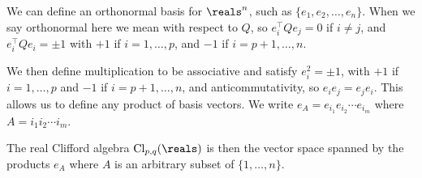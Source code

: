 \documentclass[fleqn]{NotesClass}
\newcommand*{\trans}{\top}
\begin{document}
    We can define an orthonormal basis for \(\reals^n\), such as \(\{e_1, e_2, \dotsc, e_n\}\).
    When we say orthonormal here we mean with respect to \(Q\), so \(e_i^\trans Qe_j = 0\) if \(i \ne j\), and \(e_i^\trans Qe_i = \pm 1\) with \(+1\) if \(i = 1, \dotsc, p\), and \(-1\) if \(i = p+1, \dotsc, n\).
    
    We then define multiplication to be associative and satisfy \(e_i^2 = \pm 1\), with \(+1\) if \(i = 1, \dotsc, p\) and \(-1\) if \(i = p + 1, \dotsc, n\), and anticommutativity, so \(e_ie_j = e_je_i\).
    This allows us to define any product of basis vectors.
    We write \(e_{A} = e_{i_1}e_{i_2} \dotsm e_{i_m}\) where \(A = i_1i_2\dotsm i_m\).
    
    The real Clifford algebra \(\mathrm{Cl}_{p, q}(\reals)\) is then the vector space spanned by the products \(e_A\) where \(A\) is an arbitrary subset of \(\{1, \dotsc, n\}\).
    \normalfont
    
\end{document}

